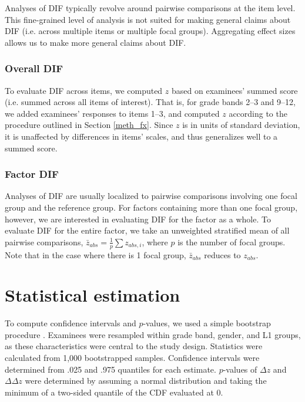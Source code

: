 \documentclass [PhD] {uclathes}
\begin{document}
Analyses of DIF typically revolve around pairwise comparisons at the item level. This fine-grained level of analysis is not suited for making general claims about DIF (i.e. across multiple items or multiple focal groups). Aggregating effect sizes allows us to make more general claims about DIF. 

\subsubsection{Overall DIF}

To evaluate DIF across items, we computed $z$ based on examinees’ summed score (i.e. summed across all items of interest). That is, for grade bands 2–3 and 9–12, we added examinees’ responses to items 1–3, and computed $z$ according to the procedure outlined in Section \ref{meth_fx}. Since $z$ is in units of standard deviation, it is unaffected by differences in items’ scales, and thus generalizes well to a summed score.

\subsubsection{Factor DIF}

Analyses of DIF are usually localized to pairwise comparisons involving one focal group and the reference group. For factors containing more than one focal group, however, we are interested in evaluating DIF for the factor as a whole. To evaluate DIF for the entire factor, we take an unweighted stratified mean of all pairwise comparisons, $\bar{z}_{abs} = \frac{1}{p} \sum{z_{abs,i}}$, where $p$ is the number of focal groups. Note that in the case where there is 1 focal group, $\bar{z}_{abs}$ reduces to $z_{abs}$.

\section{Statistical estimation}
\label{meth_boot}

To compute confidence intervals and $p$-values, we used a simple bootstrap procedure \citep{efron1994}. Examinees were resampled within grade band, gender, and L1 groups, as these characteristics were central to the study design. Statistics were calculated from 1,000 bootstrapped samples. Confidence intervals were determined from .025 and .975 quantiles for each estimate. $p$-values of $\Delta z$ and $\Delta \Delta z$ were determined by assuming a normal distribution and taking the minimum of a two-sided quantile of the CDF evaluated at 0. 
\end{document}
